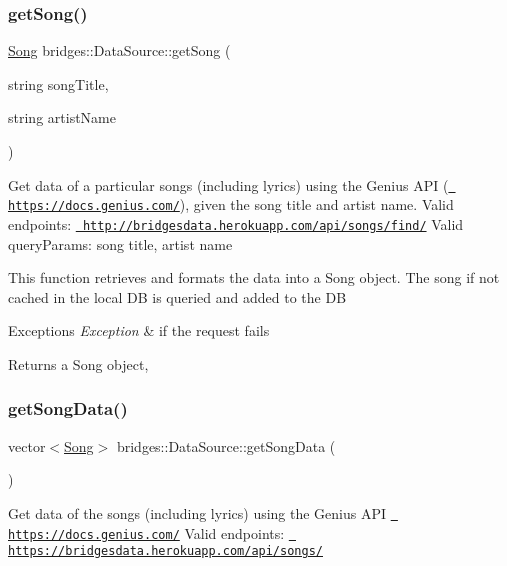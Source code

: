\subsubsection{\texorpdfstring{getSong()}{getSong()}}
{\footnotesize\ttfamily \mbox{\hyperlink{classbridges_1_1dataset_1_1_song}{Song}} bridges\+::\+Data\+Source\+::get\+Song (\begin{DoxyParamCaption}\item[{string}]{song\+Title,  }\item[{string}]{artist\+Name }\end{DoxyParamCaption})\hspace{0.3cm}{\ttfamily [inline]}}

Get data of a particular songs (including lyrics) using the Genius A\+PI (\href{https://docs.genius.com/}{\texttt{ https\+://docs.\+genius.\+com/}}), given the song title and artist name. Valid endpoints\+: \href{http://bridgesdata.herokuapp.com/api/songs/find/}{\texttt{ http\+://bridgesdata.\+herokuapp.\+com/api/songs/find/}} Valid query\+Params\+: song title, artist name

This function retrieves and formats the data into a Song object. The song if not cached in the local DB is queried and added to the DB


\begin{DoxyExceptions}{Exceptions}
{\em Exception} & if the request fails\\
\hline
\end{DoxyExceptions}
\begin{DoxyReturn}{Returns}
a Song object, 
\end{DoxyReturn}
\mbox{\label{classbridges_1_1_data_source_a5e8d035a1becf96c71569e0966e93849}} 
\subsubsection{\texorpdfstring{getSongData()}{getSongData()}}
{\footnotesize\ttfamily vector$<$\mbox{\hyperlink{classbridges_1_1dataset_1_1_song}{Song}}$>$ bridges\+::\+Data\+Source\+::get\+Song\+Data (\begin{DoxyParamCaption}{ }\end{DoxyParamCaption})\hspace{0.3cm}{\ttfamily [inline]}}

Get data of the songs (including lyrics) using the Genius A\+PI \href{https://docs.genius.com/}{\texttt{ https\+://docs.\+genius.\+com/}} Valid endpoints\+: \href{https://bridgesdata.herokuapp.com/api/songs/}{\texttt{ https\+://bridgesdata.\+herokuapp.\+com/api/songs/}}

